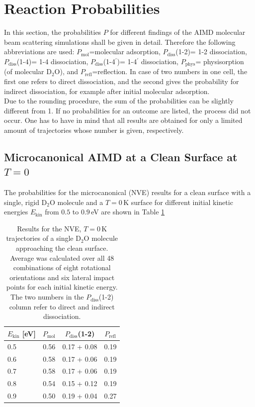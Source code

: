 \documentclass[11pt,DIV=13,BCOR=5mm,a4paper,headinclude]{scrbook}
\begin{document}
\section{Reaction Probabilities}\label{reactionprobabilities}
In this section, the probabilities $P$ for different findings of the AIMD molecular beam scattering simulations shall be given in detail.
Therefore the following abbreviations are used: $P_\textrm{mol}$=molecular adsorption, 
 $P_\textrm{diss}$(1-2)= 1-2 dissociation, $P_\textrm{diss}$(1-4)= 1-4 dissociation, $P_\textrm{diss}$(1-4$^\prime$)= 1-4$^\prime$ dissociation, $P_\textrm{phys}$= physisorption (of molecular D$_2$O), and $P_\textrm{refl}$=reflection.
In case of two numbers in one cell, the first one refers to direct dissociation, and the second gives the probability for indirect dissociation, for example after initial molecular adsorption.
\\
Due to the rounding procedure, the sum of the probabilities can be slightly different from 1.
If no probabilities for an outcome are listed, the process did not occur.
One has to have in mind that all results are obtained for only a limited amount of trajectories whose number is given, respectively.


\subsection{Microcanonical AIMD at a Clean Surface at $T=0$}
The probabilities for the microcanonical (NVE) results for a clean surface with a single, rigid D$_2$O molecule and a $T=0\,$K surface for different initial kinetic energies $E_\textrm{kin}$ from $0.5$ to $0.9\,$eV are shown in Table \ref{tab:mic_ekin}

\begin{table}[!h]
 \centering
  \caption{Results for the NVE, $T=0\,$K trajectories of a single D$_2$O molecule approaching the clean surface.
Average was calculated over all 48 combinations of eight rotational orientations and six lateral impact points for each initial kinetic energy. The two numbers in the $P_\textrm{diss}$(1-2) column refer to direct and indirect dissociation.}
%
 \begin{tabular}{l|ccc}
\toprule
 $E_\textrm{kin}$ [eV]&$P_\textrm{mol}$ & $P_\textrm{diss}$(1-2) & $P_\textrm{refl}$ \\\midrule
 0.5 & 0.56& 0.17 + 0.08& 0.19\\
 0.6 & 0.58& 0.17 + 0.06& 0.19\\
 0.7 & 0.58& 0.17 + 0.06& 0.19\\
 0.8 & 0.54& 0.15 + 0.12& 0.19\\
 0.9 & 0.50& 0.19 + 0.04& 0.27\\\bottomrule
\end{tabular}
 \label{tab:mic_ekin}
\end{table}
%
\end{document}
